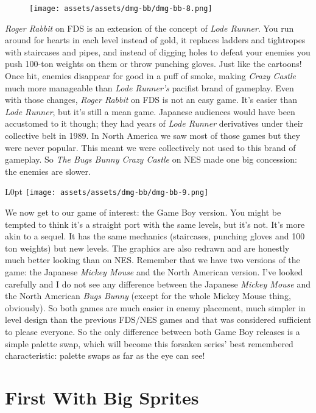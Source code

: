 \documentclass{book}
\begin{document}
\begin{figure}[hbt]
\vskip 10pt
\centering \texttt{[image: assets/assets/dmg-bb/dmg-bb-8.png]}
\vskip 6pt
\end{figure}
\emph{Roger Rabbit} on FDS is an extension of the concept of \emph{Lode Runner}. You run around for hearts in each level instead of gold, it replaces ladders and tightropes with staircases and pipes, and instead of digging holes to defeat your enemies you push 100-ton weights on them or throw punching gloves. Just like the cartoons! Once hit, enemies disappear for good in a puff of smoke, making \emph{Crazy Castle} much more manageable than \emph{Lode Runner’s} pacifist brand of gameplay. Even with those changes, \emph{Roger Rabbit} on FDS is not an easy game. It’s easier than \emph{Lode Runner}, but it’s still a mean game. Japanese audiences would have been accustomed to it though; they had years of \emph{Lode Runner} derivatives under their collective belt in 1989. In North America we saw most of those games but they were never popular. This meant we were collectively not used to this brand of gameplay. So \emph{The Bugs Bunny Crazy Castle} on NES made one big concession: the enemies are slower.

\begin{wrapfigure}{L}{0pt} \texttt{[image: assets/assets/dmg-bb/dmg-bb-9.png]}\end{wrapfigure}
We now get to our game of interest: the Game Boy version. You might be tempted to think it’s a straight port with the same levels, but it’s not. It’s more akin to a sequel. It has the same mechanics (staircases, punching gloves and 100 ton weights) but new levels. The graphics are also redrawn and are honestly much better looking than on NES. Remember that we have two versions of the game: the Japanese \emph{Mickey Mouse} and the North American version. I’ve looked carefully and I do not see any difference between the Japanese \emph{Mickey Mouse} and the North American \emph{Bugs Bunny} (except for the whole Mickey Mouse thing, obviously). So both games are much easier in enemy placement, much simpler in level design than the previous FDS/NES games and that was considered sufficient to please everyone. So the only difference between both Game Boy releases is a simple palette swap, which will become this forsaken series’ best remembered characteristic: palette swaps as far as the eye can see!

\FloatBarrier\needspace{5pt}\section*{First With Big Sprites}\nopagebreak[4]
\end{document}
